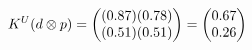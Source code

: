 \documentclass[preview]{standalone}
\begin{document}
\begin{align*}
\special{dvisvgm:raw <g id='unique000'>}K^U(d \otimes p) = \begin{pmatrix} (0.87)(0.78) \\ (0.51)(0.51) \end{pmatrix} = \begin{pmatrix} 0.67 \\ 0.26 \end{pmatrix}\special{dvisvgm:raw </g>}
\end{align*}
\end{document}
